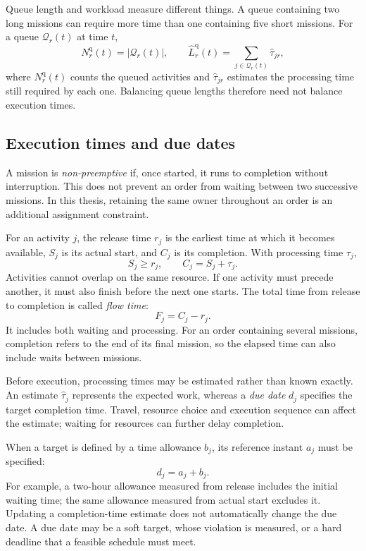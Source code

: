 Queue length and workload measure different things. A queue containing two
long missions can require more time than one containing five short missions.
For a queue $\mathcal Q_r(t)$ at time $t$,
\begin{equation}
    N_r^{\mathrm q}(t)=|\mathcal Q_r(t)|,
    \qquad
    \widehat L_r^{\mathrm q}(t)=
        \sum_{j\in\mathcal Q_r(t)}\widehat\tau_{jr},
    \label{eq:queue-estimated-workload}
\end{equation}
where $N_r^{\mathrm q}(t)$ counts the queued activities and
$\widehat\tau_{jr}$ estimates the processing time still required by each one.
Balancing queue lengths therefore need not balance execution times.

\subsection{Execution times and due dates}
\label{sec:theory-deadlines}

A mission is \textit{non-preemptive} if, once started, it runs to completion
without interruption. This does not prevent an order from waiting between two
successive missions. In this thesis, retaining the same owner throughout an
order is an additional assignment constraint.

For an activity $j$, the release time $r_j$ is the earliest time at which it
becomes available, $S_j$ is its actual start, and $C_j$ is its completion.
With processing time $\tau_j$,
\[
    S_j\geq r_j,\qquad C_j=S_j+\tau_j.
\]
Activities cannot overlap on the same resource. If one activity must precede
another, it must also finish before the next one starts.
The total time from release to completion is called \textit{flow time}:
\begin{equation}
    F_j=C_j-r_j.
    \label{eq:order-flow-time}
\end{equation}
It includes both waiting and processing. For an order containing several
missions, completion refers to the end of its final mission, so the elapsed
time can also include waits between missions.

Before execution, processing times may be estimated rather than known exactly.
An estimate $\widehat\tau_j$ represents the expected work, whereas a
\textit{due date} $d_j$ specifies the target completion time. Travel, resource
choice and execution sequence can affect the estimate; waiting for resources
can further delay completion.

When a target is defined by a time allowance $b_j$, its reference instant
$a_j$ must be specified:
\begin{equation}
    d_j=a_j+b_j.
    \label{eq:relative-deadline-scheduling}
\end{equation}
For example, a two-hour allowance measured from release includes the initial
waiting time; the same allowance measured from actual start excludes it.
Updating a completion-time estimate does not automatically change the due date.
A due date may be a soft target, whose violation is measured, or a hard deadline
that a feasible schedule must meet.

